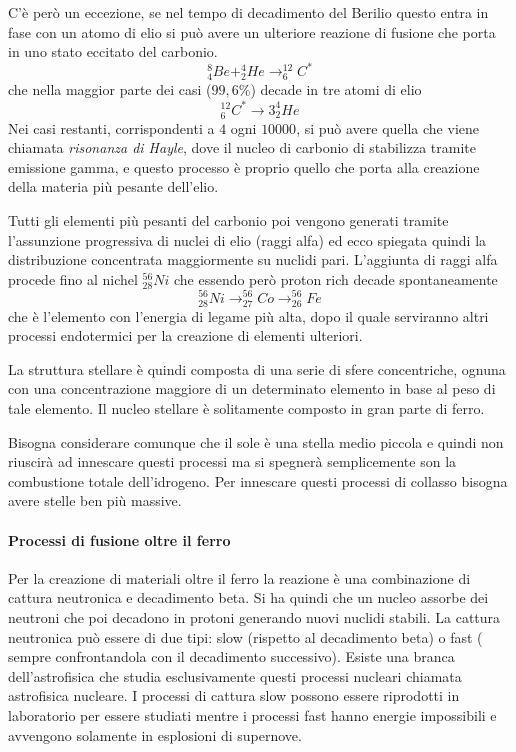 C'è però un eccezione, se nel tempo di decadimento del Berilio questo entra in fase con un atomo di elio si può avere un ulteriore reazione di fusione che porta in uno stato eccitato del carbonio.
\begin{equation}
^8_4Be+^4_2He\longrightarrow ^{12}_6C^*
\end{equation}
che nella maggior parte dei casi ($99,6\%$) decade in tre atomi di elio
\begin{equation}
^{12}_6C^*\longrightarrow 3 ^4_2He
\end{equation}
Nei casi restanti, corrispondenti a $4$ ogni $10000$, si può avere quella che viene chiamata \emph{risonanza di Hayle}, dove il nucleo di carbonio di stabilizza tramite emissione gamma, e questo processo è proprio quello che porta alla creazione della materia più pesante dell'elio.

Tutti gli elementi più pesanti del carbonio poi vengono generati tramite l'assunzione progressiva di nuclei di elio (raggi alfa) ed ecco spiegata quindi la distribuzione concentrata maggiormente su nuclidi pari.
L'aggiunta di raggi alfa procede fino al nichel $^{56}_{28}Ni$ che essendo però proton rich decade spontaneamente
\begin{equation}
^{56}_{28}Ni\longrightarrow ^{56}_{27}Co\longrightarrow ^{56}_{26}Fe
\end{equation}
che è l'elemento con l'energia di legame più alta, dopo il quale serviranno altri processi endotermici per la creazione di elementi ulteriori.

La struttura stellare è quindi composta di una serie di sfere concentriche, ognuna con una concentrazione maggiore di un determinato elemento in base al peso di tale elemento.
Il nucleo stellare è solitamente composto in gran parte di ferro.

Bisogna considerare comunque che il sole è una stella medio piccola e quindi non riuscirà ad innescare questi processi ma si spegnerà semplicemente son la combustione totale dell'idrogeno.
Per innescare questi processi di collasso bisogna avere stelle ben più massive.

\paragraph{Processi di fusione oltre il ferro}

Per la creazione di materiali oltre il ferro la reazione è una combinazione di cattura neutronica e decadimento beta.
Si ha quindi che un nucleo assorbe dei neutroni che poi decadono in protoni generando nuovi nuclidi stabili.
La cattura neutronica può essere di due tipi: slow (rispetto al decadimento beta) o fast ( sempre confrontandola con il decadimento successivo).
Esiste una branca dell'astrofisica che studia esclusivamente questi processi nucleari chiamata astrofisica nucleare.
I processi di cattura slow possono essere  riprodotti in laboratorio per essere studiati mentre i processi fast hanno energie impossibili e avvengono solamente in esplosioni di supernove.

